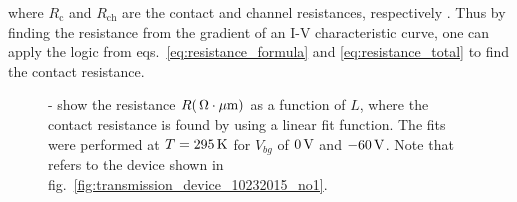 where $R_\mathrm{c}$ and $R_\mathrm{ch}$ are the contact and channel resistances, respectively \cite{Schroder_Semiconductor2006}. Thus by finding the resistance from the gradient of an I-V characteristic curve, one can apply the logic from eqs.~\ref{eq:resistance_formula} and \ref{eq:resistance_total} to find the contact resistance.
\begin{figure}[ht]
	\centering
	\qquad
	\caption[Contact resistance of $0.05\%$  doped  channel device]{\protect{}-\protect{} show the resistance $R (\,\mathrm{\Omega\cdot\mu m})$ as a function of $L$, where the contact resistance is found by using a linear fit function. The fits were performed at $T=295\,\mathrm{K}$ for $V_{bg}$ of $0\,\mathrm{V}$ and $-60\,\mathrm{V}$. Note that \protect{} refers to the device shown in fig.~\ref{fig:transmission_device_10232015_no1}.}
	\label{fig:tlm_reistance_measurement}
\end{figure}
